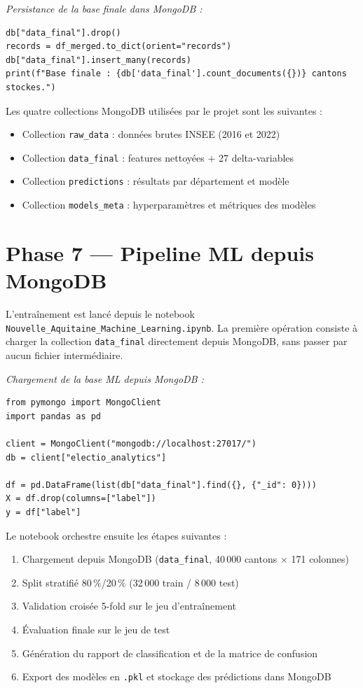 \medskip\noindent\textit{Persistance de la base finale dans MongoDB :}
\begin{verbatim}
db["data_final"].drop()
records = df_merged.to_dict(orient="records")
db["data_final"].insert_many(records)
print(f"Base finale : {db['data_final'].count_documents({})} cantons stockes.")
\end{verbatim}

Les quatre collections MongoDB utilisées par le projet sont les suivantes :

\begin{itemize}
  \item Collection \texttt{raw\_data} : données brutes INSEE (2016 et 2022)
  \item Collection \texttt{data\_final} : features nettoyées + 27 delta-variables
  \item Collection \texttt{predictions} : résultats par département et modèle
  \item Collection \texttt{models\_meta} : hyperparamètres et métriques des modèles
\end{itemize}

\section{Phase 7 --- Pipeline ML depuis MongoDB}

L'entraînement est lancé depuis le notebook
\texttt{Nouvelle\_Aquitaine\_Machine\_Learning.ipynb}.
La première opération consiste à charger la collection \texttt{data\_final}
directement depuis MongoDB, sans passer par aucun fichier intermédiaire.

\medskip\noindent\textit{Chargement de la base ML depuis MongoDB :}
\begin{verbatim}
from pymongo import MongoClient
import pandas as pd

client = MongoClient("mongodb://localhost:27017/")
db = client["electio_analytics"]

df = pd.DataFrame(list(db["data_final"].find({}, {"_id": 0})))
X = df.drop(columns=["label"])
y = df["label"]
\end{verbatim}

Le notebook orchestre ensuite les étapes suivantes :

\begin{enumerate}
  \item Chargement depuis MongoDB (\texttt{data\_final}, 40\,000 cantons $\times$ 171 colonnes)
  \item Split stratifié 80\,\%/20\,\% (32\,000 train / 8\,000 test)
  \item Validation croisée 5-fold sur le jeu d'entraînement
  \item Évaluation finale sur le jeu de test
  \item Génération du rapport de classification et de la matrice de confusion
  \item Export des modèles en \texttt{.pkl} et stockage des prédictions dans MongoDB
\end{enumerate}

